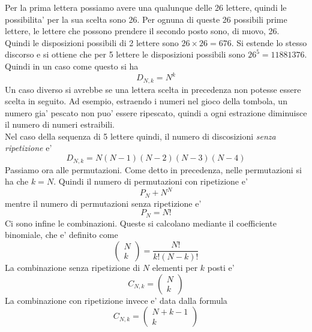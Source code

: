 \documentclass[12pt]{article}
\begin{document}
Per la prima lettera possiamo avere una qualunque delle 26 lettere, quindi le possibilita' per la sua scelta sono 26. Per ognuna di queste 26 possibili prime lettere, le lettere che possono prendere il secondo posto sono, di nuovo, 26. Quindi le disposizioni possibili di 2 lettere sono $26\times 26 = 676$. Si estende lo stesso discorso e si ottiene che per 5 lettere le disposizioni possibili sono $26^5 = 11881376$. \\
Quindi in un caso come questo si ha 
$$
	D_{N,k} = N^k
$$
Un caso diverso si avrebbe se una lettera scelta in precedenza non potesse essere scelta in seguito. Ad esempio, estraendo i numeri nel gioco della tombola, un numero gia' pescato non puo' essere ripescato, quindi a ogni estrazione diminuisce il numero di numeri estraibili. \\
Nel caso della sequenza di 5 lettere quindi, il numero di discosizioni \textit{senza ripetizione} e'
$$
	D_{N,k} = N(N-1)(N-2)(N-3)(N-4)
$$  
Passiamo ora alle permutazioni. Come detto in precedenza, nelle permutazioni si ha che $k = N$. Quindi il numero di permutazioni con ripetizione e'
$$
	P_N + N^N
$$
mentre il numero di permutazioni senza ripetizione e'
$$
	P_N = N!
$$
Ci sono infine le combinazioni. Queste si calcolano mediante il coefficiente binomiale, che e' definito come
$$
	\begin{pmatrix}
		N \\
		k
	\end{pmatrix} = \frac{N!}{k!(N-k)!}
$$
La combinazione senza ripetizione di $N$ elementi per $k$ posti e'
$$
	C_{N,k} = \begin{pmatrix}
		N \\
		k
	\end{pmatrix}  
$$
La combinazione con ripetizione invece e' data dalla formula
$$
	C_{N,k} = \begin{pmatrix}
		N + k - 1 \\
		k
	\end{pmatrix}  
$$
\end{document}
